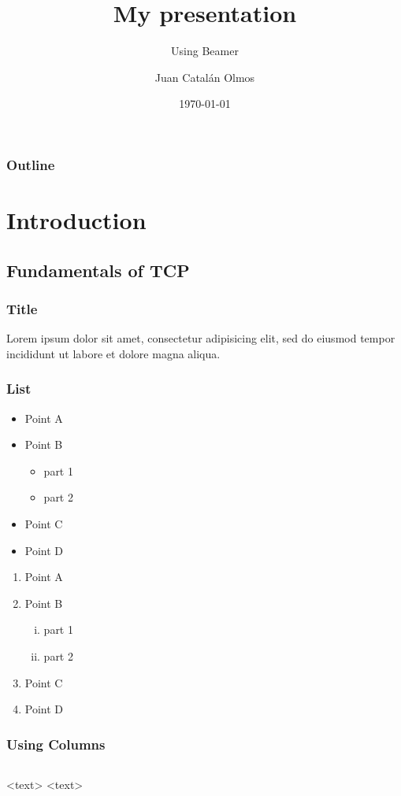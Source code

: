 \documentclass{beamer}
\title{My presentation}
\subtitle{Using Beamer}
\author{Juan Catal\'an Olmos}
\institute{Universidad T\'ecnica Federico Santa Mar\'ia}
\date{\today}
\begin{document}
\begin{frame}
\frametitle{Outline}
\tableofcontents
\end{frame}

\section{Introduction}
\subsection{Fundamentals of TCP}

\begin{frame}
\frametitle{Title}
Lorem ipsum dolor sit amet, consectetur adipisicing elit, sed do eiusmod tempor incididunt ut labore et dolore magna aliqua.
\end{frame}
	
\begin{frame}
\frametitle{List}
\begin{itemize}
\item Point A
\item Point B
\begin{itemize}
\item part 1
\item part 2
\end{itemize}
\item Point C
\item Point D
\end{itemize}
\end{frame}

\begin{frame}
\begin{enumerate}[I]
\item Point A
\item Point B
\begin{enumerate}[(i)]
\item part 1
\item part 2
\end{enumerate}
\item Point C
\item Point D
\end{enumerate}
\end{frame}

\begin{frame}
\frametitle{Using Columns}
\begin{columns}
<text>
<text>
\end{columns}
\end{frame}
\end{document}
